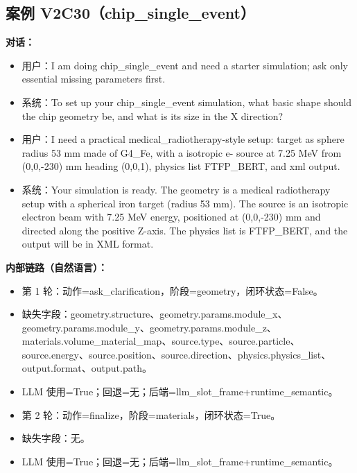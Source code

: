 \documentclass[11pt]{ctexart}
\begin{document}
\subsection{案例 V2C30（chip\_single\_event）}
\textbf{对话：}
\begin{itemize}
\item 用户：I am doing chip\_single\_event and need a starter simulation; ask only essential missing parameters first.
\item 系统：To set up your chip\_single\_event simulation, what basic shape should the chip geometry be, and what is its size in the X direction?
\item 用户：I need a practical medical\_radiotherapy-style setup: target as sphere radius 53 mm made of G4\_Fe, with a isotropic e- source at 7.25 MeV from (0,0,-230) mm heading (0,0,1), physics list FTFP\_BERT, and xml output.
\item 系统：Your simulation is ready. The geometry is a medical radiotherapy setup with a spherical iron target (radius 53 mm). The source is an isotropic electron beam with 7.25 MeV energy, positioned at (0,0,-230) mm and directed along the positive Z-axis. The physics list is FTFP\_BERT, and the output will be in XML format.
\end{itemize}
\textbf{内部链路（自然语言）：}
\begin{itemize}
\item 第 1 轮：动作=ask\_clarification，阶段=geometry，闭环状态=False。
\item 缺失字段：geometry.structure、geometry.params.module\_x、geometry.params.module\_y、geometry.params.module\_z、materials.volume\_material\_map、source.type、source.particle、source.energy、source.position、source.direction、physics.physics\_list、output.format、output.path。
\item LLM 使用=True；回退=无；后端=llm\_slot\_frame+runtime\_semantic。
\item 第 2 轮：动作=finalize，阶段=materials，闭环状态=True。
\item 缺失字段：无。
\item LLM 使用=True；回退=无；后端=llm\_slot\_frame+runtime\_semantic。
\end{itemize}
\end{document}
